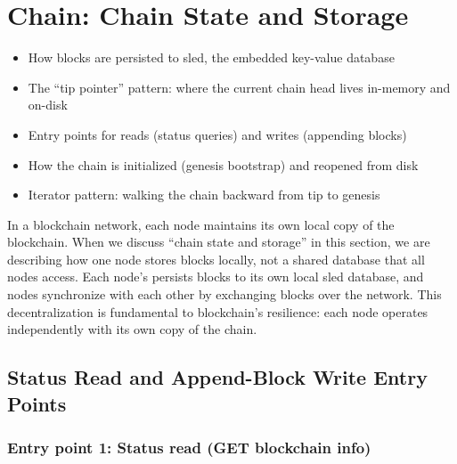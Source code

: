 \chapter{Chain: Chain State and Storage}
\label{ch:chain-state}

\begin{learnbox}
\begin{itemize}
  \item How blocks are persisted to sled, the embedded key-value database
  \item The ``tip pointer'' pattern: where the current chain head lives in-memory and on-disk
  \item Entry points for reads (status queries) and writes (appending blocks)
  \item How the chain is initialized (genesis bootstrap) and reopened from disk
  \item Iterator pattern: walking the chain backward from tip to genesis
\end{itemize}
\end{learnbox}

\begin{infobox}
In a blockchain network, each node maintains its own local copy of the blockchain. When we discuss ``chain state and storage'' in this section, we are describing how one node stores blocks locally, not a shared database that all nodes access. Each node's  persists blocks to its own local sled database, and nodes synchronize with each other by exchanging blocks over the network. This decentralization is fundamental to blockchain's resilience: each node operates independently with its own copy of the chain.
\end{infobox}

\section{Status Read and Append-Block Write Entry Points}
\label{sec:ch09-3-entry-points}

\subsection{Entry point 1: Status read (GET blockchain info)}
\label{sec:ch09-3-status-read}

